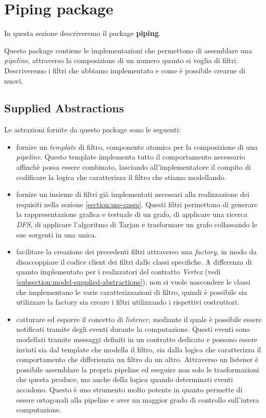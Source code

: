 \section{Piping package}

In questa sezione descriveremo il package \textbf{piping}.

Questo package contiene le implementazioni che permettono di
assemblare una \emph{pipeline}, attraverso la composizione di un
numero quanto si voglia di filtri. Descriveremo i filtri che abbiamo
implementato e come \`e possibile crearne di nuovi.

\subsection{Supplied Abstractions}

Le astrazioni fornite da questo package sono le seguenti:
\begin{itemize}
\item fornire un \emph{template} di filtro, componente atomica per la
  composizione di una \emph{pipeline}. Questo template implementa
  tutto il comportamento necessario affinch\`e possa essere combinato,
  lasciando all'implementatore il compito di codificare la logica che
  caratterizza il filtro che stiamo modellando.
\item fornire un insieme di filtri gi\`a implementati necessari alla
  realizzazione dei requisiti nella sezione
  \ref{section:use-cases}. Questi filtri permettono di generare la
  rappresentazione grafica e testuale di un grafo, di applicare una
  ricerca \emph{DFS}, di applicare l'algoritmo di Tarjan e trasformare
  un grafo collassando le sue sorgenti in una unica.
\item facilitare la creazione dei precedenti filtri attraverso una
  \emph{factory}, in modo da disaccoppiare il codice client dei filtri
  dalle classi specifiche. A differenza di quanto implementato per i
  realizzatori del contratto \emph{Vertex} (vedi
  \ref{subsection:model-supplied-abstractions}), non si vuole
  nascondere le classi che implementano le varie caratterizzazioni di
  filtro, quindi \`e possibile sia utilizzare la factory sia creare i
  filtri utilizzando i rispettivi costruttori.
\item catturare ed esporre il concetto di \emph{listener}, mediante il
  quale \`e possibile essere notificati tramite degli eventi durante
  la computazione. Questi eventi sono modellati tramite messaggi
  definiti in un contratto dedicato e possono essere inviati sia dal
  template che modella il filtro, sia dalla logica che caratterizza il
  comportamento che differienzia un filtro da un altro. Attraverso un
  listener \`e possibile assemblare la propria pipeline ed eseguire
  non solo le trasformazioni che questa produce, ma anche della logica
  quando determinati eventi accadono. Questo \`e uno strumento molto
  potente in quanto permette di essere ortogonali alla pipeline e aver
  un maggior grado di controllo sull'intera computazione.
\end{itemize}

